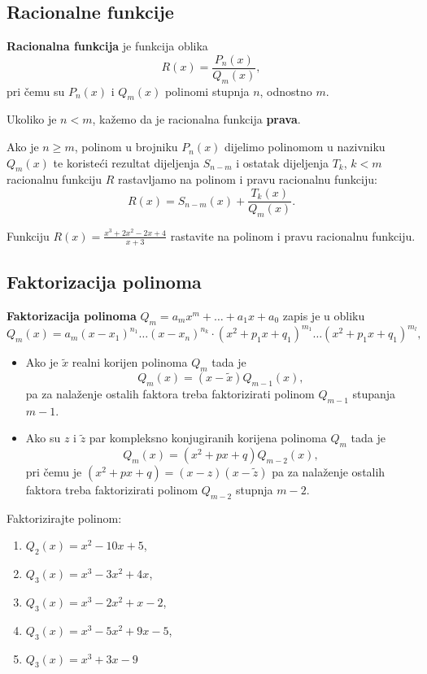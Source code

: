 \subsection{Racionalne funkcije}

\textbf{Racionalna funkcija} je funkcija oblika
$$
R(x) = \frac{P_n(x)}{Q_m(x)},
$$
pri čemu su $P_n(x)$ i $Q_m(x)$ polinomi stupnja $n$, odnostno $m$.

Ukoliko je $n < m$, kažemo da je racionalna funkcija \textbf{prava}.

Ako je $n \geq m$, polinom u brojniku $P_n(x)$ dijelimo polinomom u nazivniku
$Q_m(x)$ te koristeći rezultat dijeljenja $S_{n-m}$ i ostatak dijeljenja $T_k$,
$k<m$ racionalnu funkciju $R$ rastavljamo na polinom i pravu racionalnu
funkciju:
$$
R(x) = S_{n-m}(x) + \frac{T_k(x)}{Q_m(x)}.
$$

\begin{example}
    Funkciju $R(x)=\frac{x^3+2x^2-2x+4}{x+3}$ rastavite na polinom i pravu
    racionalnu funkciju.
\end{example}

\subsection{Faktorizacija polinoma}

\textbf{Faktorizacija polinoma} $Q_m=a_mx^m+\dots+a_1x+a_0$ zapis je u obliku
$$
Q_m(x) = a_m(x-x_1)^{n_1}\dots(x-x_n)^{n_k}\cdot(x^2+p_1x+q_1)^{m_1}\dots(x^2+p_1x+q_1)^{m_l},
$$

\begin{itemize}
    \item Ako je $\tilde{x}$ realni korijen polinoma $Q_m$ tada je
    $$
    Q_m(x) = (x-\tilde{x})Q_{m-1}(x),
    $$
    pa za nalaženje ostalih faktora treba faktorizirati polinom $Q_{m-1}$
    stupanja $m-1$.
    \item Ako su $z$ i $\tilde{z}$ par kompleksno konjugiranih korijena polinoma
    $Q_m$ tada je
    $$
    Q_m(x) = (x^2+px+q)Q_{m-2}(x),
    $$
    pri čemu je $(x^2+px+q) = (x-z)(x-\tilde{z})$ pa za nalaženje ostalih
    faktora treba faktorizirati polinom $Q_{m-2}$ stupnja $m-2$.
\end{itemize}

\begin{example}
    Faktorizirajte polinom:
    \begin{enumerate}
        \item $Q_2(x) = x^2-10x+5$,
        \item $Q_3(x) = x^3-3x^2+4x$,
        \item $Q_3(x) = x^3-2x^2+x-2$,
        \item $Q_3(x) = x^3-5x^2+9x-5$,
        \item $Q_3(x) = x^3+3x-9$
    \end{enumerate}
\end{example}

